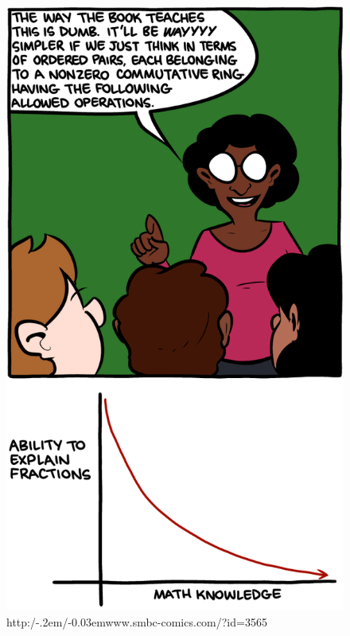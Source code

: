 \documentclass{uebblatt}
\newcommand{\http}{http:/\kern-.2em/\kern-0.03em}
\begin{document}
\setlength{\wrapoverhang}{1.4cm}
\setlength{\columnsep}{0.8cm}
\begin{figure}
  \vspace{-2em}
  \href{http://www.smbc-comics.com/?id=3565}{\includegraphics[scale=0.25]{images/smbc-fractions}}
  \tiny\sffamily \http www.smbc-comics.com/?id=3565
\end{figure}
\end{document}
